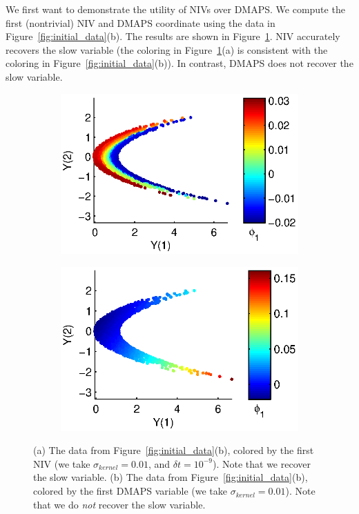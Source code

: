 \documentclass[1p]{elsarticle}
\begin{document}
We first want to demonstrate the utility of NIVs over DMAPS. 
%
We compute the first (nontrivial) NIV and DMAPS coordinate using the data in Figure~\ref{fig:initial_data}(b). 
%
The results are shown in Figure~\ref{fig:NIV_versus_DMAPS}.
%
NIV accurately recovers the slow variable (the coloring in Figure~\ref{fig:NIV_versus_DMAPS}(a) is consistent with the coloring in Figure~\ref{fig:initial_data}(b)). 
%
In contrast, DMAPS does not recover the slow variable. 

\begin{figure}[h]
\begin{subfigure}{0.5\textwidth}
\includegraphics[width=\textwidth]{data_transformed_colored_NIV}
\caption{}
\end{subfigure}
\begin{subfigure}{0.5\textwidth}
\includegraphics[width=\textwidth]{data_transformed_colored_DMAPS}
\caption{}
\end{subfigure}
\caption{(a) The data from Figure~\ref{fig:initial_data}(b), colored by the first NIV (we take $\sigma_{kernel} = 0.01$, and $\delta t = 10^{-9}$). Note that we recover the slow variable. (b) The data from Figure~\ref{fig:initial_data}(b), colored by the first DMAPS variable (we take $\sigma_{kernel} = 0.01$). Note that we do {\em not} recover the slow variable.}
\label{fig:NIV_versus_DMAPS}
\end{figure}
\end{document}
